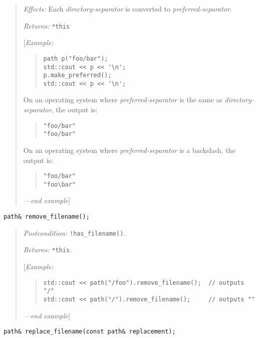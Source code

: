 \begin{quote}
\emph{Effects:} Each \emph{directory-separator} is converted to
\emph{preferred-separator}.

\emph{Returns:} \texttt{*this}

{[}\emph{Example:}

\begin{quote}
\begin{verbatim}
path p("foo/bar");
std::cout << p << '\n';
p.make_preferred();
std::cout << p << '\n';
\end{verbatim}
\end{quote}

On an operating system where \emph{preferred-separator} is the same as
\emph{directory-separator}, the output is:

\begin{quote}
\begin{verbatim}
"foo/bar"
"foo/bar"
\end{verbatim}
\end{quote}

On an operating system where \emph{preferred-separator} is a backslash,
the output is:

\begin{quote}
\begin{verbatim}
"foo/bar"
"foo\bar"
\end{verbatim}
\end{quote}

\emph{---end example}{]}
\end{quote}

\begin{verbatim}
path& remove_filename();
\end{verbatim}

\begin{quote}
\emph{Postcondition:} \texttt{!has\_filename()}.

\emph{Returns:} \texttt{*this}.

{[}\emph{Example:}

\begin{quote}
\begin{verbatim}
std::cout << path("/foo").remove_filename();  // outputs "/"
std::cout << path("/").remove_filename();     // outputs ""
\end{verbatim}
\end{quote}

\emph{---end example}{]}
\end{quote}

\begin{verbatim}
path& replace_filename(const path& replacement);
\end{verbatim}


